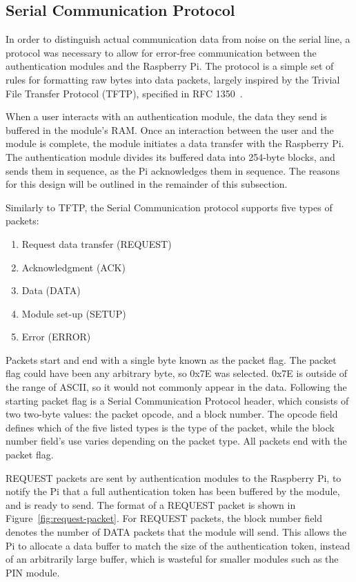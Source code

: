 \documentclass[12pt]{report}
\let\Oldsubsection\subsection
\renewcommand{\subsection}{\FloatBarrier\Oldsubsection}
\begin{document}
\subsection{Serial Communication Protocol} \label{serial-communication-protocol}

In order to distinguish actual communication data from noise on the serial line, a protocol was necessary to allow for 
error-free communication between the authentication modules and the Raspberry Pi. The protocol is a simple set of rules 
for formatting raw bytes into data packets, largely inspired by the Trivial File Transfer Protocol (TFTP), specified in 
RFC 1350~\autocite{RFC1350}.

When a user interacts with an authentication module, the data they send is buffered in the module's RAM. Once an 
interaction between the user and the module is complete, the module initiates a data transfer with the Raspberry Pi. 
The authentication module divides its buffered data into 254-byte blocks, and sends them in sequence, as the Pi 
acknowledges them in sequence. The reasons for this design will be outlined in the remainder of this subsection.

Similarly to TFTP, the Serial Communication protocol supports five types of packets:
\begin{enumerate}
    \item Request data transfer (REQUEST)
    \item Acknowledgment (ACK)
    \item Data (DATA)
    \item Module set-up (SETUP)
    \item Error (ERROR)
\end{enumerate}
Packets start and end with a single byte known as the packet flag. The packet flag could have been any arbitrary byte, 
so 0x7E was selected. 0x7E is outside of the range of ASCII, so it would not commonly appear in the data. Following the 
starting packet flag is a Serial Communication Protocol header, which consists of two two-byte values: the packet 
opcode, and a block number. The opcode field defines which of the five listed types is the type of the packet, while 
the block number field's use varies depending on the packet type. All packets end with the packet flag.

REQUEST packets are sent by authentication modules to the Raspberry Pi, to notify the Pi that a full authentication 
token has been buffered by the module, and is ready to send.  The format of a REQUEST packet is shown in 
Figure~\ref{fig:request-packet}. For REQUEST packets, the block number field denotes the number of DATA packets that 
the module will send. This allows the Pi to allocate a data buffer to match the size of the authentication token, 
instead of an arbitrarily large buffer, which is wasteful for smaller modules such as the PIN module.
\end{document}
